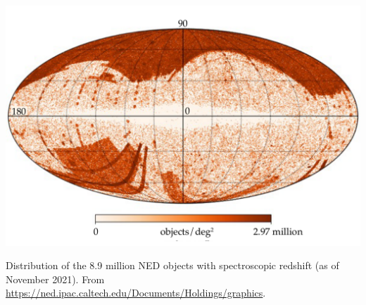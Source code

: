 \documentclass[
    a4paper, %
    fontsize=10pt, %
    twoside=true, %
    numbers=noenddot, %
    fontmethod=tex,
]{kaobook}
\begin{document}
\begin{marginfigure}
    \includegraphics{fu/nedz.pdf}
    \caption[NED spectroscopic redshift distribution]{Distribution of the 8.9 million NED objects with spectroscopic redshift (as of November 2021). From \url{https://ned.ipac.caltech.edu/Documents/Holdings/graphics}.}
\end{marginfigure} 
\end{document}
